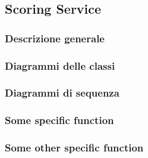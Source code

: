 \subsection{Scoring Service}
\subsubsection{Descrizione generale}
\subsubsection{Diagrammi delle classi}
\subsubsection{Diagrammi di sequenza}
\subsubsection{Some specific function}
\subsubsection{Some other specific function}
